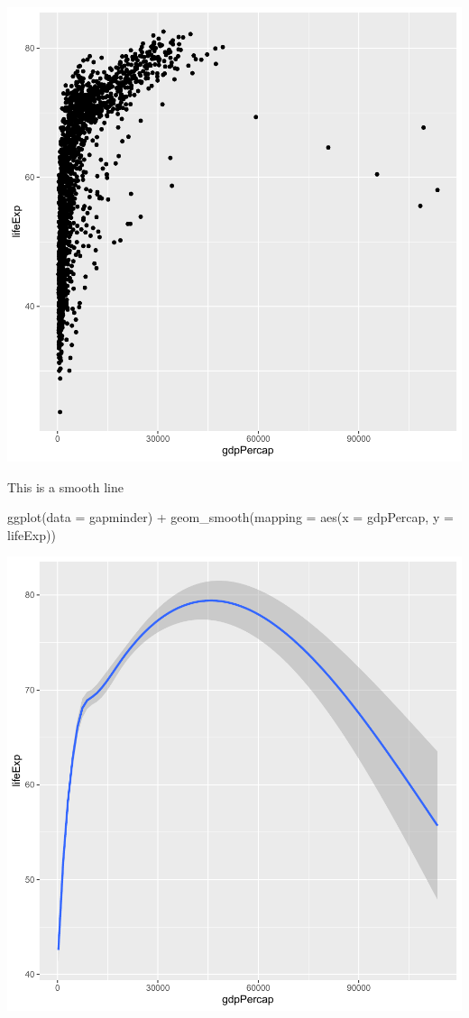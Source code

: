 \documentclass[
]{book}
\makeatletter
\newenvironment{Shaded}{\begin{snugshade}}{\end{snugshade}}
\newcommand{\AttributeTok}[1]{\textcolor[rgb]{0.61,0.61,0.61}{#1}}
\newcommand{\FunctionTok}[1]{\textcolor[rgb]{0,0,0}{#1}}
\newcommand{\NormalTok}[1]{#1}
\newcommand{\SpecialCharTok}[1]{\textcolor[rgb]{0,0,0}{#1}}
\newenvironment{kframe}{%
\medskip{}
\setlength{\fboxsep}{.8em}
 \def\at@end@of@kframe{}%
 \ifinner\ifhmode%
  \def\at@end@of@kframe{\end{minipage}}%
  \begin{minipage}{\columnwidth}%
 \fi\fi%
 \def\FrameCommand##1{\hskip\@totalleftmargin \hskip-\fboxsep
 \colorbox{shadecolor}{##1}\hskip-\fboxsep
     \hskip-\linewidth \hskip-\@totalleftmargin \hskip\columnwidth}%
 \MakeFramed {\advance\hsize-\width
   \@totalleftmargin\z@ \linewidth\hsize
   \@setminipage}}%
 {\par\unskip\endMakeFramed%
 \at@end@of@kframe}
\renewenvironment{Shaded}{\begin{kframe}}{\end{kframe}}
\makeatother
\begin{document}
\begin{center}\includegraphics[width=0.7\linewidth,keepaspectratio]{Multivariable_Data_Analysis_files/figure-latex/unnamed-chunk-25-1} \end{center}

This is a smooth line

\begin{Shaded}
\begin{Highlighting}[]
\FunctionTok{ggplot}\NormalTok{(}\AttributeTok{data =}\NormalTok{ gapminder) }\SpecialCharTok{+}
  \FunctionTok{geom\_smooth}\NormalTok{(}\AttributeTok{mapping =} \FunctionTok{aes}\NormalTok{(}\AttributeTok{x =}\NormalTok{ gdpPercap, }\AttributeTok{y =}\NormalTok{ lifeExp))}
\end{Highlighting}
\end{Shaded}

\begin{center}\includegraphics[width=0.7\linewidth,keepaspectratio]{Multivariable_Data_Analysis_files/figure-latex/unnamed-chunk-26-1} \end{center}
\end{document}
